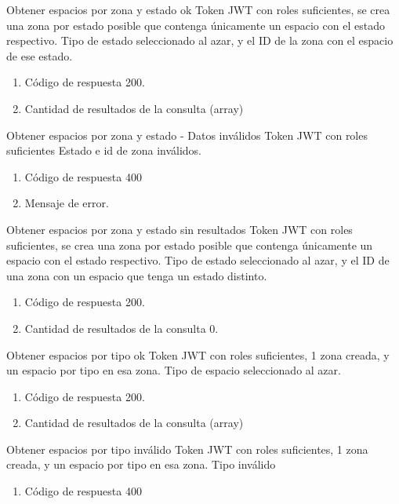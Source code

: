{Obtener espacios por zona y estado ok}
{Token JWT con roles suficientes, se crea una zona por estado posible que contenga únicamente un espacio con el estado respectivo.}
{Tipo de estado seleccionado al azar, y el ID de la zona con el espacio de ese estado.}
{\begin{enumerate} [leftmargin=*, nosep]
    \item Código de respuesta 200.
    \item Cantidad de resultados de la consulta (array)
\end{enumerate}}

{Obtener espacios por zona y estado - Datos inválidos}
{Token JWT con roles suficientes}
{Estado e id de zona inválidos.}
{\begin{enumerate} [leftmargin=*, nosep]
    \item Código de respuesta 400
    \item Mensaje de error.
\end{enumerate}}

{Obtener espacios por zona y estado sin resultados}
{Token JWT con roles suficientes, se crea una zona por estado posible que contenga únicamente un espacio con el estado respectivo.}
{Tipo de estado seleccionado al azar, y el ID de una zona con un espacio que tenga un estado distinto.}
{\begin{enumerate} [leftmargin=*, nosep]
    \item Código de respuesta 200.
    \item Cantidad de resultados de la consulta 0.
\end{enumerate}}

{Obtener espacios por tipo ok}
{Token JWT con roles suficientes, 1 zona creada, y un espacio por tipo en esa zona.}
{Tipo de espacio seleccionado al azar.}
{\begin{enumerate} [leftmargin=*, nosep]
    \item Código de respuesta 200.
    \item Cantidad de resultados de la consulta (array)
\end{enumerate}}

{Obtener espacios por tipo inválido}
{Token JWT con roles suficientes, 1 zona creada, y un espacio por tipo en esa zona.}
{Tipo inválido}
{\begin{enumerate} [leftmargin=*, nosep]
    \item Código de respuesta 400
\end{enumerate}}

